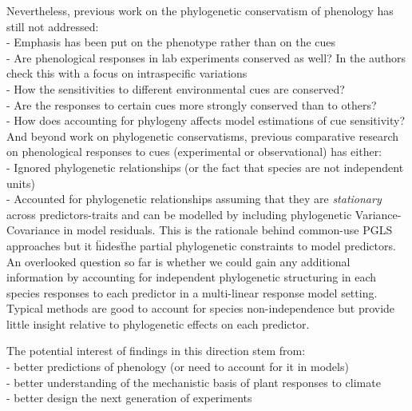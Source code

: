 \documentclass{article}\usepackage[]{graphicx}\usepackage[]{color}
\begin{document}
Nevertheless, previous work on the phylogenetic conservatism of phenology has still not addressed:\\

- Emphasis has been put on the phenotype rather than on the cues\\
- Are phenological responses in lab experiments conserved as well? In \cite{joly2019importance} the authors check this with a focus on intraspecific variations\\
- How the sensitivities to different environmental cues are conserved?\\
- Are the responses to certain cues more strongly conserved than to others?\\
- How does accounting for phylogeny affects model estimations of cue sensitivity?\\

And beyond work on phylogenetic conservatisms, previous comparative research on phenological responses to cues (experimental or observational) has either:\\

- Ignored phylogenetic relationships (or the fact that species are not independent units)\\
- Accounted for phylogenetic relationships assuming that they are \emph{stationary} across predictors-traits and can be modelled by including phylogenetic Variance-Covariance in model residuals. This is the rationale behind common-use PGLS approaches but it \"hides\" the partial phylogenetic constraints to model predictors.\\ 

An overlooked question so far is whether we could gain any additional information by accounting for independent phylogenetic structuring in each species responses to each predictor in a multi-linear response model setting. Typical methods are good to account for species non-independence but provide little insight relative to phylogenetic effects on each predictor.



The potential interest of findings in this direction stem from:\\
- better predictions of phenology (or need to account for it in models)\\
- better understanding of the mechanistic basis of plant responses to climate\\
- better design the next generation of experiments \\
\end{document}
